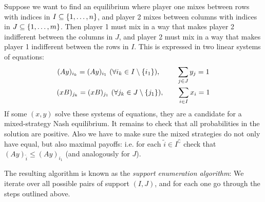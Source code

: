 \documentclass[a4paper]{scrreprt}
\begin{document}
    Suppose we want to find an equilibrium where player one mixes between rows with indices in $I \subseteq \{1, \dots, n\}$, and player 2 mixes between columns with indices in $J \subseteq \{1, \dots, m\}$. Then player 1 must mix in a way that makes player 2 indifferent between the columns in $J$, and player 2 must mix in a way that makes player 1 indifferent between the rows in $I$.
    This is expressed in two linear systems of equations:
    \begin{gather}
        (Ay)_{i_k} = (Ay)_{i_1} ~(\forall i_k \in I \setminus\{i_1\}), \qquad\;\, \sum_{j \in J} y_j = 1 \\
        (xB)_{j_k} = (xB)_{j_1} ~(\forall j_k \in J \setminus\{j_1\}), \qquad \sum_{i \in I} x_i = 1
    \end{gather}
    If some $(x, y)$ solve these systems of equations, they are a candidate for a mixed-strategy Nash equilibrium.
    It remains to check that all probabilities in the solution are positive. Also we have to make sure the mixed strategies do not only have equal, but also maximal payoffs: i.e. for each $\tilde{i}\in I^\complement$ check that $(Ay)_{\tilde{i}} \leq (Ay)_{i_1}$ (and analogously for $J$).
    
    The resulting algorithm is known as the \emph{support enumeration algorithm}: We iterate over all possible pairs of support $(I, J)$, and for each one go through the steps outlined above. 
    
    
\end{document}
